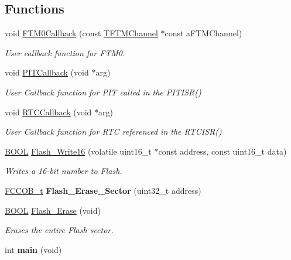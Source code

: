 \subsection*{Functions}
\begin{DoxyCompactItemize}
\item 
void \hyperlink{group___main__module_gabb280e64231bb7c73085a48303a9c28f}{F\+T\+M0\+Callback} (const \hyperlink{struct_t_f_t_m_channel}{T\+F\+T\+M\+Channel} $\ast$const a\+F\+T\+M\+Channel)
\begin{DoxyCompactList}\small\item\em User callback function for F\+T\+M0. \end{DoxyCompactList}\item 
void \hyperlink{group___main__module_ga83e32d3437f8fdbf06974d23242a9462}{P\+I\+T\+Callback} (void $\ast$arg)
\begin{DoxyCompactList}\small\item\em User Callback function for P\+I\+T called in the P\+I\+T\+I\+S\+R() \end{DoxyCompactList}\item 
void \hyperlink{group___main__module_ga2dabe81b72bf8ec8155cd875975beb07}{R\+T\+C\+Callback} (void $\ast$arg)
\begin{DoxyCompactList}\small\item\em User Callback function for R\+T\+C referenced in the R\+T\+C\+I\+S\+R() \end{DoxyCompactList}\item 
\hyperlink{types_8h_a3e5b8192e7d9ffaf3542f1210aec18dd}{B\+O\+O\+L} \hyperlink{group___main__module_ga3b1945cab517f6d476c9e365dcba02c7}{Flash\+\_\+\+Write16} (volatile uint16\+\_\+t $\ast$const address, const uint16\+\_\+t data)
\begin{DoxyCompactList}\small\item\em Writes a 16-\/bit number to Flash. \end{DoxyCompactList}\item 
\hypertarget{group___main__module_ga5951819bf5f7375fd9ed9a5f416e86b9}{}\hyperlink{struct_f_c_c_o_b__t}{F\+C\+C\+O\+B\+\_\+t} {\bfseries Flash\+\_\+\+Erase\+\_\+\+Sector} (uint32\+\_\+t address)\label{group___main__module_ga5951819bf5f7375fd9ed9a5f416e86b9}

\item 
\hyperlink{types_8h_a3e5b8192e7d9ffaf3542f1210aec18dd}{B\+O\+O\+L} \hyperlink{group___main__module_ga6e818ce3e68dff71d2975bb887c5b7bc}{Flash\+\_\+\+Erase} (void)
\begin{DoxyCompactList}\small\item\em Erases the entire Flash sector. \end{DoxyCompactList}\item 
\hypertarget{group___main__module_ga840291bc02cba5474a4cb46a9b9566fe}{}int {\bfseries main} (void)\label{group___main__module_ga840291bc02cba5474a4cb46a9b9566fe}

\end{DoxyCompactItemize}
